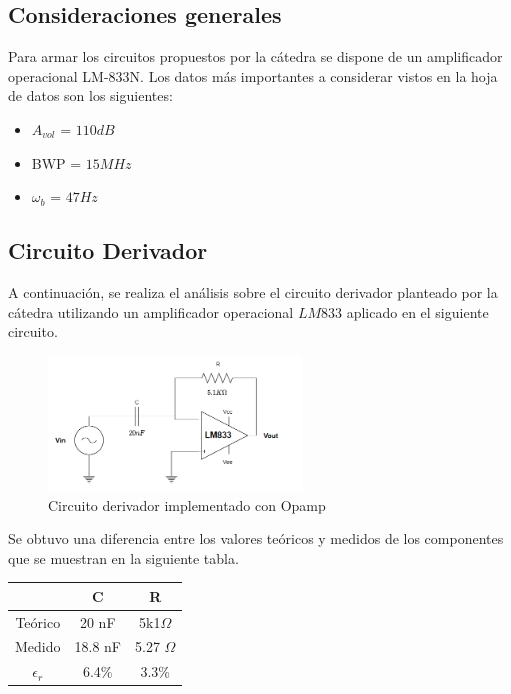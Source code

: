 \subsection{Consideraciones generales}

Para armar los circuitos propuestos por la cátedra se dispone de un
amplificador operacional LM-833N. Los datos más importantes a considerar
vistos en la hoja de datos son los siguientes:
\begin{itemize}
    \item $A_{vol}$ = $110dB$ 
    \item BWP = $15 MHz$
    \item $\omega_b$ = $47 Hz$
\end{itemize}   

\subsection{Circuito Derivador}

A continuación, se realiza el análisis sobre el circuito derivador planteado
por la cátedra utilizando un amplificador operacional $LM833$ aplicado en el siguiente circuito.
\begin{figure}[H]
    \centering
    \includegraphics[width=0.6\textwidth]{../Ejercicio3-CircuitoIntegradoresyDerivadores/Imagenes/Derivador/circuito_derivador.png}
    \caption{Circuito derivador implementado con Opamp}
\end{figure}
Se obtuvo una diferencia entre los valores teóricos y medidos de los componentes 
que se muestran en la siguiente tabla.
\begin{table}[H]
    \centering
    \begin{tabular}{|c|c|c|}
    \hline
                 & C       & R             \\ \hline
    Teórico      & 20 nF   & 5k1$\Omega$   \\ \hline
    Medido       & 18.8 nF & 5.27 $\Omega$ \\ \hline
    $\epsilon_r$ & 6.4\%    & 3.3\%          \\ \hline
    \end{tabular}
    \end{table}


